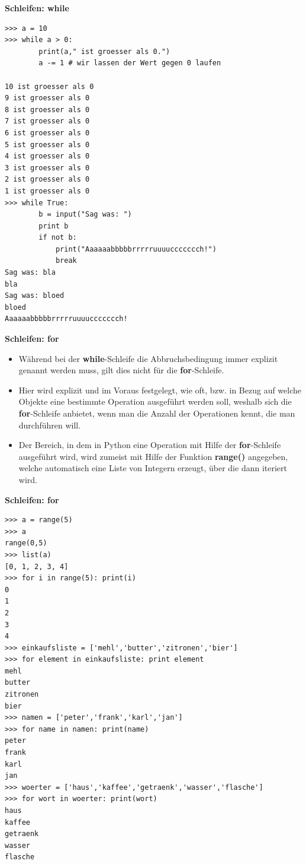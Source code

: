 \par\noindent\textbf{Schleifen: while}

\begin{verbatim}
>>> a = 10
>>> while a > 0: 
        print(a," ist groesser als 0.")
        a -= 1 # wir lassen der Wert gegen 0 laufen

10 ist groesser als 0
9 ist groesser als 0
8 ist groesser als 0
7 ist groesser als 0
6 ist groesser als 0
5 ist groesser als 0
4 ist groesser als 0
3 ist groesser als 0
2 ist groesser als 0
1 ist groesser als 0
>>> while True:
        b = input("Sag was: ")
        print b
        if not b:
            print("Aaaaaabbbbbrrrrruuuuccccccch!")
            break
Sag was: bla
bla
Sag was: bloed
bloed
Aaaaaabbbbbrrrrruuuuccccccch!
\end{verbatim}




\par\noindent\textbf{Schleifen: for}

\begin{itemize}
\itemsep1pt\parskip0pt
\item
  {Während bei der \textbf{while}-Schleife die Abbruchsbedingung immer
  explizit genannt werden muss, gilt dies nicht für die
  \textbf{for}-Schleife.}
\item
  {Hier wird explizit und im Voraus festgelegt, wie oft, bzw. in Bezug
  auf welche Objekte eine bestimmte Operation ausgeführt werden soll,
  weshalb sich die \textbf{for}-Schleife anbietet, wenn man die Anzahl
  der Operationen kennt, die man durchführen will.}
\item
  {Der Bereich, in dem in Python eine Operation mit Hilfe der
  \textbf{for}-Schleife ausgeführt wird, wird zumeist mit Hilfe der
  Funktion \textbf{range()} angegeben, welche automatisch eine Liste von
  Integern erzeugt, über die dann iteriert wird.}
\end{itemize}




\par\noindent\textbf{Schleifen: for}

\begin{verbatim}
>>> a = range(5)
>>> a
range(0,5)
>>> list(a)
[0, 1, 2, 3, 4]
>>> for i in range(5): print(i)
0
1
2
3
4
>>> einkaufsliste = ['mehl','butter','zitronen','bier']
>>> for element in einkaufsliste: print element
mehl
butter
zitronen
bier
>>> namen = ['peter','frank','karl','jan']
>>> for name in namen: print(name)
peter
frank
karl
jan
>>> woerter = ['haus','kaffee','getraenk','wasser','flasche']
>>> for wort in woerter: print(wort)
haus
kaffee
getraenk
wasser
flasche
\end{verbatim}


